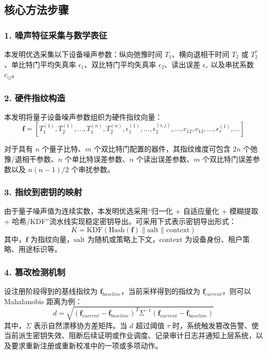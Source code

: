 \documentclass[12pt,a4paper]{article}
\begin{document}
\subsection{核心方法步骤}

\subsubsection{1. 噪声特征采集与数学表征}
本发明优选采集以下设备噪声参数：纵向弛豫时间 $T_1$、横向退相干时间 $T_2$ 或 $T_2^*$、单比特门平均失真率 $\epsilon_1$、双比特门平均失真率 $\epsilon_2$、读出误差 $\epsilon_r$ 以及串扰系数 $c_{ij}$。

\subsubsection{2. 硬件指纹构造}
本发明将量子设备噪声参数组织为硬件指纹向量：
\[
\mathbf{f} = [T_1^{(1)}, T_2^{(1)}, \ldots, T_1^{(n)}, T_2^{(n)}, \epsilon_1^{(1)}, \ldots, \epsilon_2^{(i,j)}, \ldots, c_{12}, c_{13}, \ldots, \epsilon_r^{(1)}, \ldots ]
\]

对于具有 $n$ 个量子比特、$m$ 个双比特门配置的器件，其指纹维度可包含 $2n$ 个弛豫/退相干参数、$n$ 个单比特误差参数、$n$ 个读出误差参数、$m$ 个双比特门误差参数以及 $n(n-1)/2$ 个串扰参数。

\subsubsection{3. 指纹到密钥的映射}
由于量子噪声值为连续实数，本发明优选采用“归一化 + 自适应量化 + 模糊提取 + 哈希/KDF”流水线实现稳定密钥导出。可采用下式表示密钥导出形式：
\[
K = \mathrm{KDF}(\mathrm{Hash}(\mathbf{f}) \| \mathrm{salt} \| \mathrm{context})
\]
其中，$\mathbf{f}$ 为指纹向量，$\mathrm{salt}$ 为随机或策略上下文，$\mathrm{context}$ 为设备身份、租户策略、用途标识等。

\subsubsection{4. 篡改检测机制}
设注册阶段得到的基线指纹为 $\mathbf{f}_{baseline}$，当前采样得到的指纹为 $\mathbf{f}_{current}$，则可以 Mahalanobis 距离为例：
\[
d = \sqrt{(\mathbf{f}_{current}-\mathbf{f}_{baseline})^T \Sigma^{-1}(\mathbf{f}_{current}-\mathbf{f}_{baseline})}
\]
其中，$\Sigma$ 表示自然漂移协方差矩阵。当 $d$ 超过阈值 $\tau$ 时，系统触发篡改告警、使当前派生密钥失效、阻断后续证明或作业调度、记录审计日志并通知上层系统，以及要求重新注册或重新校准中的一项或多项动作。
\end{document}
